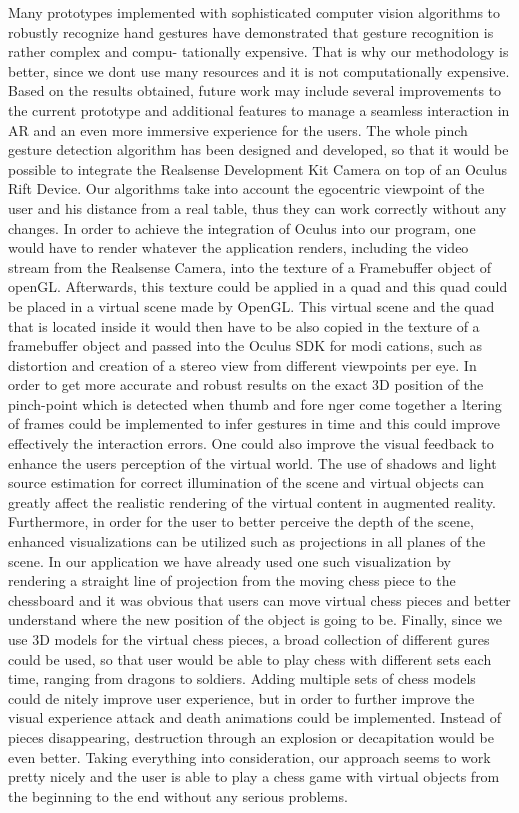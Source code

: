 Many prototypes implemented with sophisticated computer vision algorithms to robustly recognize hand gestures have demonstrated that gesture recognition is rather complex and compu- tationally expensive. That is why our methodology is better, since we dont use many resources and it is not computationally expensive. Based on the results obtained, future work may include several improvements to the current prototype and additional features to manage a seamless interaction in AR and an even more immersive experience for the users. The whole pinch gesture detection algorithm has been designed and developed, so that it would be possible to integrate the Realsense Development Kit Camera on top of an Oculus Rift Device. Our algorithms take into account the egocentric viewpoint of the user and his distance from a real table, thus they can work correctly without any changes. In order to achieve the integration of Oculus into our program, one would have to render whatever the application renders, including the video stream from the Realsense Camera, into the texture of a Framebuffer object of openGL. Afterwards, this texture could be applied in a quad and this quad could be placed in a virtual scene made by OpenGL. This virtual scene and the quad that is located inside it would then have to be also copied in the texture of a framebuffer object and passed into the Oculus SDK for modi cations, such as distortion and creation of a stereo view from different viewpoints per eye. In order to get more accurate and robust results on the exact 3D position of the pinch-point which is detected when thumb and fore nger come together a ltering of frames could be implemented to infer gestures in time and this could improve effectively the interaction errors. One could also improve the visual feedback to enhance the users perception of the virtual world. The use of shadows and light source estimation for correct illumination of the scene and virtual objects can greatly affect the realistic rendering of the virtual content in augmented reality. Furthermore, in order for the user to better perceive the depth of the scene, enhanced visualizations can be utilized such as projections in all planes of the scene. In our application we have already used one such visualization by rendering a straight line of projection from the moving chess piece to the chessboard and it was obvious that users can move virtual chess pieces and better understand where the new position of the object is going to be. Finally, since we use 3D models for the virtual chess pieces, a broad collection of different gures could be used, so that user would be able to play chess with different sets each time, ranging from dragons to soldiers. Adding multiple sets of chess models could de nitely improve user experience, but in order to further improve the visual experience attack and death animations could be implemented. Instead of pieces disappearing, destruction through an explosion or decapitation would be even better. Taking everything into consideration, our approach seems to work pretty nicely and the user is able to play a chess game with virtual objects from the beginning to the end without any serious problems.

